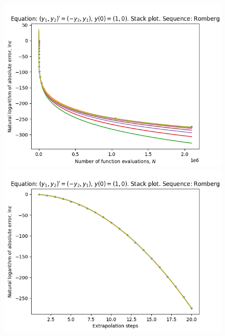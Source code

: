 \begin{figure}[H]
\centering
\begin{minipage}{0.45\textwidth}
\centering
\includegraphics[scale=0.45]{../results/emr_plots/rotation_hp_romberg_stack.png}
\end{minipage}
\begin{minipage}{0.45\textwidth}
\centering
\includegraphics[scale=0.45]{../results/emr_plots/rotation_hp_romberg_steps_stack.png}
\end{minipage}
\end{figure}

